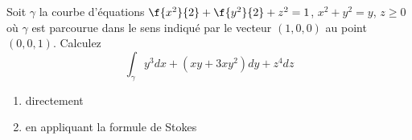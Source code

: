 
\begin{exercice}\label{exoVariete0018}

Soit $\gamma$ la courbe d'équations $\f{x^2}{2}+\f{y^2}{2}+z^2=1$, $x^2+y^2=y$, $z\geq0$ où $\gamma$ est parcourue dans le sens indiqué par le vecteur $(1,0,0)$ au point $(0,0,1)$. Calculez
\[\int_\gamma y^3dx+(xy+3xy^2)dy+z^4dz\]
\begin{enumerate}
\item directement
\item en appliquant la formule de Stokes
\end{enumerate}

\end{exercice}
